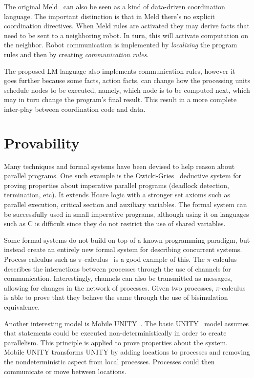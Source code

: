 The original Meld~\cite{ashley-rollman-iclp09} can also be seen as a kind of data-driven coordination language. The important distinction is that
in Meld there's no explicit coordination directives. When Meld rules are activated they may derive facts that need to be sent to a neighboring robot. In turn, this will activate computation on the neighbor. Robot communication is implemented by \emph{localizing} the program rules
and then by creating \emph{communication rules}.

The proposed LM language also implements communication rules, however it goes further because
some facts, action facts, can change how the processing units schedule nodes to be executed, namely, which node is to be computed next, which may in turn change
the program's final result. This result in a more complete inter-play between coordination code and data.

\section{Provability}

Many techniques and formal systems have been devised to help reason about parallel programs.
One such example is the Owicki-Gries~\cite{Owicki:1976:VPP:360051.360224} deductive system
for proving properties about imperative parallel programs (deadlock detection, termination, etc).
It extends Hoare logic with a stronger set axioms such as parallel execution, critical section
and auxiliary variables. The formal system can be successfully used in small imperative
programs, although using it on languages such as C is difficult since they do not
restrict the use of shared variables.

Some formal systems do not build on top of a known programming paradigm, but instead
create an entirely new formal system for describing concurrent systems. Process calculus
such as $\pi$-calculus~\cite{Milner:1999:CMS:329902} is a good example of this.
The $\pi$-calculus describes the interactions between processes
through the use of channels for communication. Interestingly, channels can also be transmitted as
messages, allowing for changes in the network of processes.
Given two processes, $\pi$-calculus is able to prove that they behave the same through
the use of bisimulation equivalence.

Another interesting model is Mobile UNITY~\cite{Roman97anintroduction}. The basic UNITY~\cite{UNITY} model assumes that statements could be executed non-deterministically
in order to create parallelism. This principle is applied to prove properties about
the system.
Mobile UNITY transforms UNITY by adding locations to processes and removing the
nondeterministic aspect from local processes. Processes could then communicate or move
between locations.

